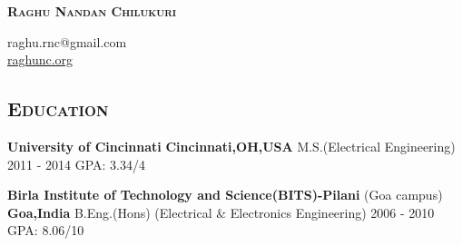 \documentclass[10pt]{article}
\begin{document}
\begin{center}
 \textbf{ \textsc{\Large Raghu Nandan Chilukuri}}

raghu.rnc@gmail.com
 \\
\href{http://raghunc.org}{raghunc.org}
\end{center}

			       

\subsection*{\textsc{\large Education}}                 
\textbf{University of Cincinnati} \hfill \textbf{Cincinnati,OH,USA} \newline
M.S.(Electrical Engineering) \hfill 2011 - 2014 \newline
GPA: 3.34/4 \newline
     
\noindent \textbf{Birla Institute of Technology and Science(BITS)-Pilani} (Goa campus) \hfill  \textbf{Goa,India} \newline %
B.Eng.(Hons) (Electrical \& Electronics Engineering) \hfill 2006 - 2010 \newline
GPA: 8.06/10 \newline
\end{document}
